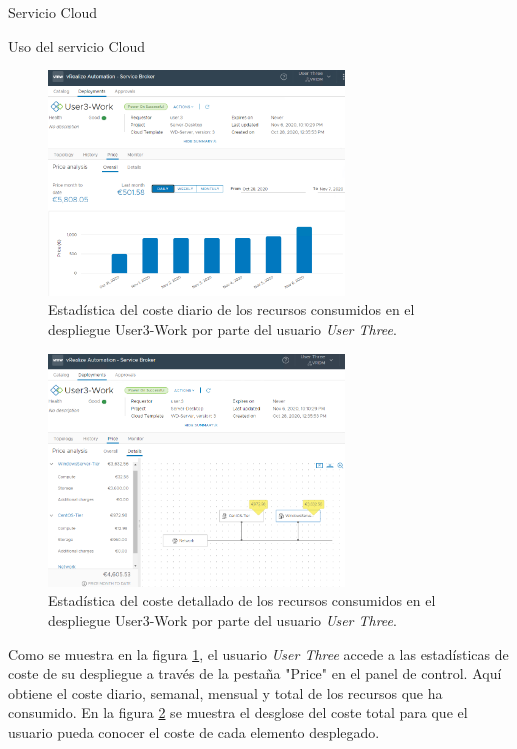 \begin{subsection}{Servicio Cloud}
\begin{subsubsection}{Uso del servicio Cloud}
        \begin{figure}[h]
            \centering
            \includegraphics[width=0.7\textwidth]{imaxes/pruebaconcepto/vrealize/price-user3-work.png}
            \caption{Estadística del coste diario de los recursos consumidos en el despliegue User3-Work por parte del usuario \textit{User Three}.}
            \label{fig:user3-daily-price}
        \end{figure}
        \FloatBarrier
        \begin{figure}[h]
            \centering
            \includegraphics[width=0.7\textwidth]{imaxes/pruebaconcepto/vrealize/user3-price-details.png}
            \caption{Estadística del coste detallado de los recursos consumidos en el despliegue User3-Work por parte del usuario \textit{User Three}.}
            \label{fig:user3-detail-price}
        \end{figure}
        \FloatBarrier
        Como se muestra en la figura \ref{fig:user3-daily-price}, el usuario \textit{User Three} accede a las estadísticas de coste de su despliegue a través de la pestaña "Price" en el panel de control. Aquí obtiene el coste diario, semanal, mensual y total de los recursos que ha consumido. En la figura \ref{fig:user3-detail-price} se muestra el desglose del coste total para que el usuario pueda conocer el coste de cada elemento desplegado.

\end{subsubsection}
\end{subsection}
